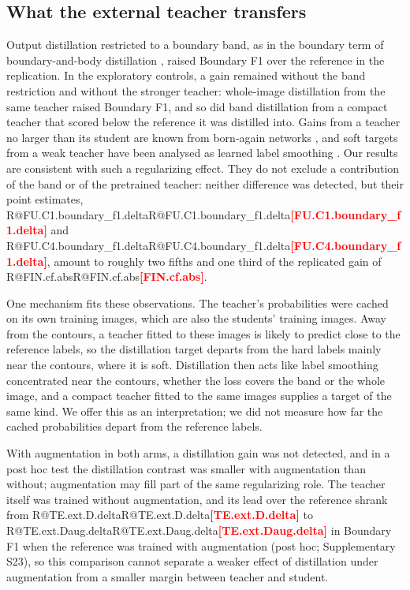 \documentclass[fleqn,10pt,lineno]{wlpeerj}
\makeatletter
\newcommand{\R}[1]{\ifcsname R@#1\endcsname\csname R@#1\endcsname\else\textbf{\textcolor{red}{[#1]}}\fi}
\makeatother
\begin{document}
\subsection*{What the external teacher transfers}
Output distillation \citep{Hinton2015Distilling} restricted to a boundary band, as in the boundary term of boundary-and-body distillation \citep{Liu2024BPKD}, raised Boundary F1 over the reference in the replication. In the exploratory controls, a gain remained without the band restriction and without the stronger teacher: whole-image distillation from the same teacher raised Boundary F1, and so did band distillation from a compact teacher that scored below the reference it was distilled into. Gains from a teacher no larger than its student are known from born-again networks \citep{Furlanello2018Born}, and soft targets from a weak teacher have been analysed as learned label smoothing \citep{Yuan2020Revisiting}. Our results are consistent with such a regularizing effect. They do not exclude a contribution of the band or of the pretrained teacher: neither difference was detected, but their point estimates, \R{FU.C1.boundary_f1.delta} and \R{FU.C4.boundary_f1.delta}, amount to roughly two fifths and one third of the replicated gain of \R{FIN.cf.abs}.

One mechanism fits these observations. The teacher's probabilities were cached on its own training images, which are also the students' training images. Away from the contours, a teacher fitted to these images is likely to predict close to the reference labels, so the distillation target departs from the hard labels mainly near the contours, where it is soft. Distillation then acts like label smoothing concentrated near the contours, whether the loss covers the band or the whole image, and a compact teacher fitted to the same images supplies a target of the same kind. We offer this as an interpretation; we did not measure how far the cached probabilities depart from the reference labels.

With augmentation in both arms, a distillation gain was not detected, and in a post hoc test the distillation contrast was smaller with augmentation than without; augmentation may fill part of the same regularizing role. The teacher itself was trained without augmentation, and its lead over the reference shrank from \R{TE.ext.D.delta} to \R{TE.ext.Daug.delta} in Boundary F1 when the reference was trained with augmentation (post hoc; Supplementary S23), so this comparison cannot separate a weaker effect of distillation under augmentation from a smaller margin between teacher and student.
\end{document}
